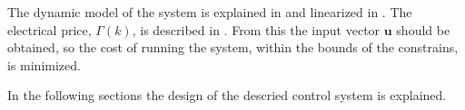 The dynamic model of the system is explained in  and linearized in . The electrical price, $\Gamma(k)$, is described in . From this the input vector $\pmb{u}$ should be obtained, so the cost of running the system, within the bounds of the constrains, is minimized. 



In the following sections the design of the descried control system is explained. 







